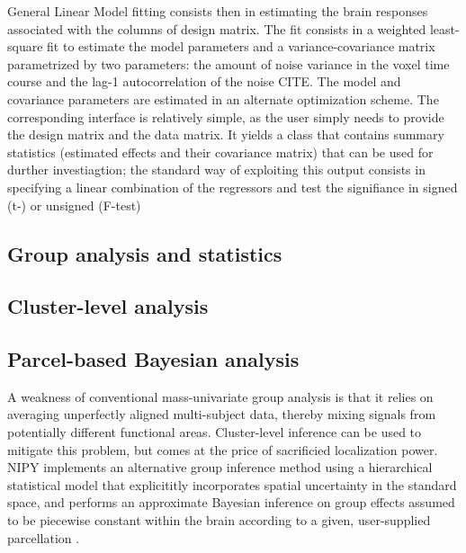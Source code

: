 \documentclass{bioinfo}
\begin{document}

General Linear Model fitting consists then in estimating the brain
responses associated with the columns of design matrix.
%
The fit consists in a weighted least-square fit to estimate the model
parameters and a variance-covariance matrix parametrized by two
parameters: the amount of noise variance in the voxel time course and
the lag-1 autocorrelation of the noise CITE. 
%
The model and covariance parameters are estimated in an alternate
optimization scheme.
%
The corresponding interface is relatively simple, as the user simply
needs to provide the design matrix and the data matrix. 
%
It yields a class that contains summary statistics (estimated effects
and their covariance matrix) that can be used for durther
investiagtion; the standard way of exploiting this output consists in
specifying a linear combination of the regressors and test the
signifiance in signed (t-) or unsigned (F-test)
%


\subsection{Group analysis and statistics}



\subsection{Cluster-level analysis}



\subsection{Parcel-based Bayesian analysis}

A weakness of conventional mass-univariate group analysis is that it
relies on averaging unperfectly aligned multi-subject data, thereby
mixing signals from potentially different functional
areas. Cluster-level inference can be used to mitigate this problem,
but comes at the price of sacrificied localization power. NIPY
implements an alternative group inference method using a hierarchical
statistical model that explicititly incorporates spatial uncertainty
in the standard space, and performs an approximate Bayesian inference
on group effects assumed to be piecewise constant within the brain
according to a given, user-supplied parcellation
\citep{keller:sinica:08,keller:miccai:09}. 
\end{document}
